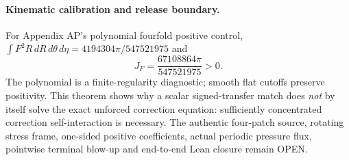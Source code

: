 \paragraph{Kinematic calibration and release boundary.}
For Appendix AP's polynomial fourfold positive control,
$\int F^2R\,dR\,d\theta\,d\eta=4194304\pi/547521975$ and
\[
\boxed{J_F=\frac{67108864\pi}{547521975}>0.}
\]
The polynomial is a finite-regularity diagnostic; smooth flat cutoffs preserve positivity. This theorem shows why a scalar signed-transfer match does \emph{not} by itself solve the exact unforced correction equation: sufficiently concentrated correction self-interaction is necessary. The authentic four-patch source, rotating stress frame, one-sided positive coefficients, actual periodic pressure flux, pointwise terminal blow-up and end-to-end Lean closure remain OPEN.
